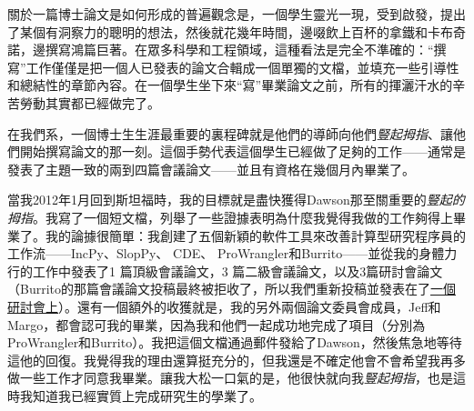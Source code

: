 \documentclass[12pt,UTF8,nofonts]{book}
\begin{document}
\breakline

關於一篇博士論文是如何形成的普遍觀念是，一個學生靈光一現，受到啟發，提出了某個有洞察力的聰明的想法，然後就花幾年時間，邊啜飲上百杯的拿鐵和卡布奇諾，邊撰寫鴻篇巨著。在眾多科學和工程領域，這種看法是完全不準確的：“撰寫”工作僅僅是把一個人已發表的論文合輯成一個單獨的文檔，並填充一些引導性和總結性的章節內容。在一個學生坐下來“寫”畢業論文之前，所有的揮灑汗水的辛苦勞動其實都已經做完了。

在我們系，一個博士生生涯最重要的裏程碑就是他們的導師向他們\emph{豎起拇指}、讓他們開始撰寫論文的那一刻。這個手勢代表這個學生已經做了足夠的工作——通常是發表了主題一致的兩到四篇會議論文——並且有資格在幾個月內畢業了。

當我2012年1月回到斯坦福時，我的目標就是盡快獲得Dawson那至關重要的\emph{豎起的拇指}。我寫了一個短文檔，列舉了一些證據表明為什麼我覺得我做的工作夠得上畢業了。我的論據很簡單：我創建了五個新穎的軟件工具來改善計算型研究程序員的工作流——IncPy、SlopPy、 CDE、 ProWrangler和Burrito——並從我的身體力行的工作中發表了1 篇頂級會議論文，3 篇二級會議論文，以及3篇研討會論文（Burrito的那篇會議論文投稿最終被拒收了，所以我們重新投稿並發表在了\href{http://www.pgbovine.net/projects/pubs/guo_burrito_tapp_2012.pdf}{一個研討會上}）。還有一個額外的收獲就是，我的另外兩個論文委員會成員，Jeff和Margo，都會認可我的畢業，因為我和他們一起成功地完成了項目（分別為ProWrangler和Burrito）。我把這個文檔通過郵件發給了Dawson，然後焦急地等待這他的回復。我覺得我的理由還算挺充分的，但我還是不確定他會不會希望我再多做一些工作才同意我畢業。讓我大松一口氣的是，他很快就向我\emph{豎起拇指}，也是這時我知道我已經實質上完成研究生的學業了。
\end{document}
